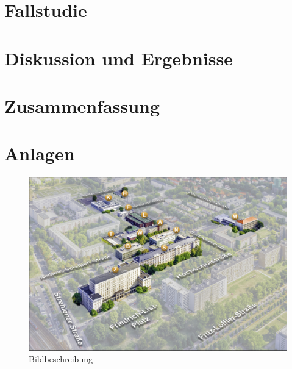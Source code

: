 \documentclass[
 openright,
 a4paper
]{scrreprt}
\begin{document}
\chapter{Fallstudie}





\chapter{Diskussion und Ergebnisse}


\chapter{Zusammenfassung}

\nocite{*}
\printbibliography
{}

\appendix
\chapter*{Anlagen} \label{Anlagen}
\setcounter{chapter}{1} 

\begin{figure}[!ht]
\centering
\includegraphics[width=\textwidth]{Bilddatei}
\caption{Bildbeschreibung}
\label{fig:Bildlabel}
\end{figure}

\clearpage
\thispagestyle{empty}
\begin{center}
\vfill
\phantom{© \makeatletter\@author\makeatother}
\end{center}
\end{document}
